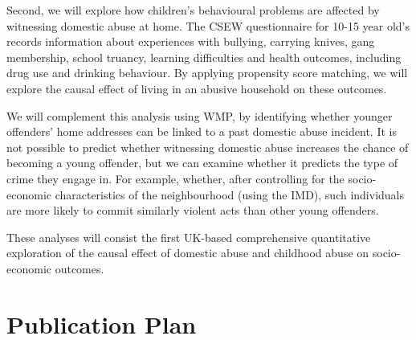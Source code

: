 \documentclass[11pt, a4paper]{article}
\begin{document}
%
%



Second, we will explore how children's behavioural problems are affected by witnessing domestic abuse at home. The CSEW questionnaire for 10-15 year old's records information about experiences with bullying, carrying knives, gang membership, school truancy, learning difficulties and health outcomes, including drug use and drinking behaviour. By applying propensity score matching, we will explore the causal effect of living in an abusive household on these outcomes.

We will complement this analysis using WMP, by identifying whether younger offenders' home addresses can be linked to a past domestic abuse incident. It is not possible to predict whether witnessing domestic abuse increases the chance of becoming a young offender, but we can examine whether it predicts the type of crime they engage in. For example, whether, after controlling for the socio-economic characteristics of the neighbourhood (using the IMD), such individuals are more likely to commit similarly violent acts than other young offenders.

 These analyses will consist the first UK-based comprehensive quantitative exploration of the causal effect of domestic abuse and childhood abuse on socio-economic outcomes. 
 
 \section{Publication Plan}
 
\end{document}
